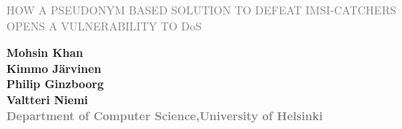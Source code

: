 \documentclass[portrait,a0]{a0poster}
\begin{document}
\begin{multicols}{2} 
\begin{minipage}[t]{1.4\linewidth}
\vspace{70pt}
\begin{flushleft}
\begin{spacing}{5}
{\Huge{}\textcolor{gray}{\MakeUppercase{How a Pseudonym Based Solution to Defeat IMSI-catchers Opens a Vulnerability to} DoS} \MakeUppercase{}} \\

\end{spacing}
\end{flushleft}
\end{minipage}

\begin{minipage}[t]{.95\linewidth} %
\vspace{35pt} %
\begin{flushright}
\textsf{\bfseries
Mohsin Khan \\
Kimmo Järvinen\\
Philip Ginzboorg\\
Valtteri Niemi\\
} %
\textcolor{gray}{\textsf{\bfseries{Department of Computer Science,University of Helsinki}}}
\end{flushright}
\end{minipage}
\end{multicols}


\noindent\makebox[\linewidth]{\rule{\paperwidth}{3pt}}
\end{document}
